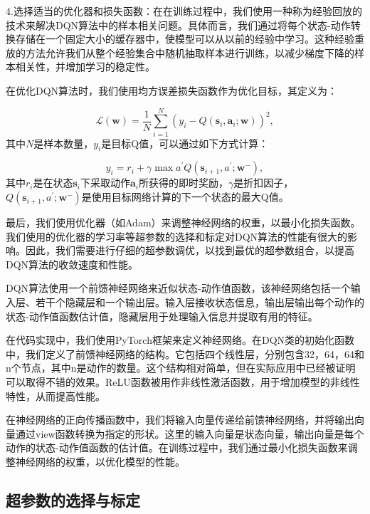 4.选择适当的优化器和损失函数：在在训练过程中，我们使用一种称为经验回放的技术来解决DQN算法中的样本相关问题。具体而言，我们通过将每个状态-动作转换存储在一个固定大小的缓存器中，使模型可以从以前的经验中学习。这种经验重放的方法允许我们从整个经验集合中随机抽取样本进行训练，以减少梯度下降的样本相关性，并增加学习的稳定性。

在优化DQN算法时，我们使用均方误差损失函数作为优化目标，其定义为：

\begin{equation}
\mathcal{L}(\mathbf{w})=\frac{1}{N} \sum_{i=1}^{N}\left(y_{i}-Q\left(\bm{s}_{i}, \bm{a}_{i} ; \mathbf{w}\right)\right)^{2},
\end{equation}
其中$N$是样本数量，$y_i$是目标Q值，可以通过如下方式计算：

\begin{equation}
y_{i}=r_{i}+\gamma \max {a^{\prime}} Q\left(\bm{s}_{i+1}, a^{\prime} ; \mathbf{w}^{-}\right),
\end{equation}
其中$r_i$是在状态$\bm{s}_i$下采取动作$\bm{a}_i$所获得的即时奖励，$\gamma$是折扣因子，$Q(\bm{s}_{i+1},a^{\prime};\mathbf{w}^{-})$是使用目标网络计算的下一个状态的最大Q值。

最后，我们使用优化器（如Adam）来调整神经网络的权重，以最小化损失函数。我们使用的优化器的学习率等超参数的选择和标定对DQN算法的性能有很大的影响。因此，我们需要进行仔细的超参数调优，以找到最优的超参数组合，以提高DQN算法的收敛速度和性能。


DQN算法使用一个前馈神经网络来近似状态-动作值函数，该神经网络包括一个输入层、若干个隐藏层和一个输出层。输入层接收状态信息，输出层输出每个动作的状态-动作值函数估计值，隐藏层用于处理输入信息并提取有用的特征。

在代码实现中，我们使用PyTorch框架来定义神经网络。在DQN类的初始化函数中，我们定义了前馈神经网络的结构。它包括四个线性层，分别包含32，64，64和n个节点，其中n是动作的数量。这个结构相对简单，但在实际应用中已经被证明可以取得不错的效果。ReLU函数被用作非线性激活函数，用于增加模型的非线性特性，从而提高性能。

在神经网络的正向传播函数中，我们将输入向量传递给前馈神经网络，并将输出向量通过view函数转换为指定的形状。这里的输入向量是状态向量，输出向量是每个动作的状态-动作值函数的估计值。在训练过程中，我们通过最小化损失函数来调整神经网络的权重，以优化模型的性能。


\subsection{超参数的选择与标定}

